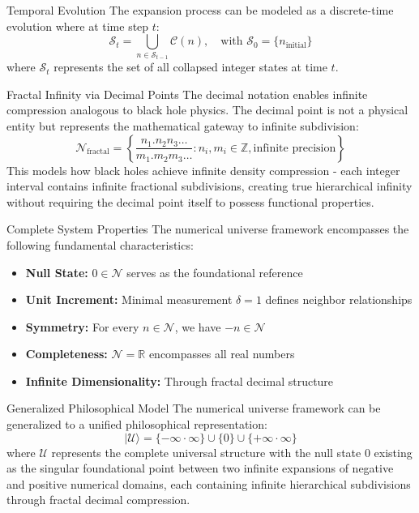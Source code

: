\documentclass[11pt]{article}
\newcommand{\bbR}{\mathbb{R}}
\newcommand{\be}{\begin{equation}}
\newcommand{\ee}{\end{equation}}
\begin{document}
        \begin{postulate}{Temporal Evolution}
            The expansion process can be modeled as a discrete-time evolution where at time step $t$:
            \be
                \mathcal{S}_t = \bigcup_{n \in \mathcal{S}_{t-1}} \mathcal{C}(n), \quad \text{with } \mathcal{S}_0 = \{n_{\text{initial}}\}
            \ee
            where $\mathcal{S}_t$ represents the set of all collapsed integer states at time $t$.
        \end{postulate}

        \begin{postulate}{Fractal Infinity via Decimal Points}
            The decimal notation enables infinite compression analogous to black hole physics. The decimal point is not a physical entity but represents the mathematical gateway to infinite subdivision:
            \be
                \mathcal{N}_{\text{fractal}} = \left\{\frac{n_1.n_2n_3\ldots}{m_1.m_2m_3\ldots} : n_i,m_i \in \mathbb{Z}, \text{infinite precision}\right\}
            \ee
            This models how black holes achieve infinite density compression - each integer interval contains infinite fractional subdivisions, creating true hierarchical infinity without requiring the decimal point itself to possess functional properties.
        \end{postulate}

        \begin{postulate}{Complete System Properties}
            The numerical universe framework encompasses the following fundamental characteristics:
            \begin{itemize}
                \item \textbf{Null State:} $0 \in \mathcal{N}$ serves as the foundational reference
                \item \textbf{Unit Increment:} Minimal measurement $\delta = 1$ defines neighbor relationships
                \item \textbf{Symmetry:} For every $n \in \mathcal{N}$, we have $-n \in \mathcal{N}$
                \item \textbf{Completeness:} $\mathcal{N} = \bbR$ encompasses all real numbers
                \item \textbf{Infinite Dimensionality:} Through fractal decimal structure
            \end{itemize}
        \end{postulate}

        \begin{postulate}{Generalized Philosophical Model}
            The numerical universe framework can be generalized to a unified philosophical representation:
            \be
                | \mathcal{U}\rangle = \{-\infty \cdot \infty\} \cup \{0\} \cup \{+\infty \cdot \infty\}
            \ee
            where $\mathcal{U}$ represents the complete universal structure with the null state $0$ existing as the singular foundational point between two infinite expansions of negative and positive numerical domains, each containing infinite hierarchical subdivisions through fractal decimal compression.
        \end{postulate}
\end{document}
